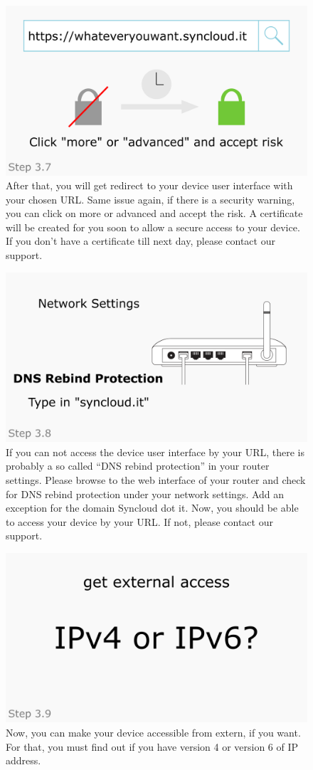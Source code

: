 \documentclass[a4paper,12pt]{article}
\begin{document}
\begin{figure}[htbp!]
	\centering
	\includegraphics[width=0.7\linewidth]{../frames/36.png}
	\caption{After that, you will get redirect to your device user interface with your chosen URL. Same issue again, if there is a security warning, you can click on more or advanced and accept the risk. A certificate will be created for you soon to allow a secure access to your device. If you don’t have a certificate till next day, please contact our support.}
	\label{fig:24}
\end{figure}

\begin{figure}[htbp!]
	\centering
	\includegraphics[width=0.7\linewidth]{../frames/37.png}
	\caption{If you can not access the device user interface by your URL, there is probably a so called “DNS rebind protection” in your router settings. Please browse to the web interface of your router and check for DNS rebind protection under your network settings. Add an exception for the domain Syncloud dot it. Now, you should be able to access your device by your URL. If not, please contact our support.}
	\label{fig:25}
\end{figure}

\begin{figure}[htbp!]
	\centering
	\includegraphics[width=0.7\linewidth]{../frames/38.png}
	\caption{Now, you can make your device accessible from extern, if you want. For that, you must find out if you have version 4 or version 6 of IP address.}
	\label{fig:26}
\end{figure}
\end{document}
